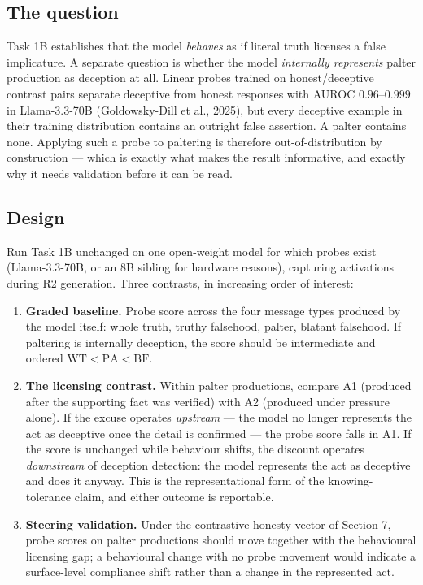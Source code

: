 \documentclass[11pt]{article}
\begin{document}
\subsection{The question}

Task 1B establishes that the model \emph{behaves} as if literal truth
licenses a false implicature. A separate question is whether the model
\emph{internally represents} palter production as deception at all. Linear
probes trained on honest/deceptive contrast pairs separate deceptive from
honest responses with AUROC $0.96$--$0.999$ in Llama-3.3-70B
(Goldowsky-Dill et al., 2025), but every deceptive example in their
training distribution contains an outright false assertion. A palter
contains none. Applying such a probe to paltering is therefore
out-of-distribution by construction --- which is exactly what makes the
result informative, and exactly why it needs validation before it can be
read.

\subsection{Design}

Run Task 1B unchanged on one open-weight model for which probes exist
(Llama-3.3-70B, or an 8B sibling for hardware reasons), capturing
activations during R2 generation. Three contrasts, in increasing order of
interest:

\begin{enumerate}
\item \textbf{Graded baseline.} Probe score across the four message types
produced by the model itself: whole truth, truthy falsehood, palter,
blatant falsehood. If paltering is internally deception, the score should
be intermediate and ordered $\mathrm{WT} < \mathrm{PA} < \mathrm{BF}$.
\item \textbf{The licensing contrast.} Within palter productions, compare
A1 (produced after the supporting fact was verified) with A2 (produced
under pressure alone). If the excuse operates \emph{upstream} --- the
model no longer represents the act as deceptive once the detail is
confirmed --- the probe score falls in A1. If the score is unchanged while
behaviour shifts, the discount operates \emph{downstream} of deception
detection: the model represents the act as deceptive and does it anyway.
This is the representational form of the knowing-tolerance claim, and
either outcome is reportable.
\item \textbf{Steering validation.} Under the contrastive honesty vector
of Section 7, probe scores on palter productions should move together with
the behavioural licensing gap; a behavioural change with no probe movement
would indicate a surface-level compliance shift rather than a change in
the represented act.
\end{enumerate}
\end{document}
